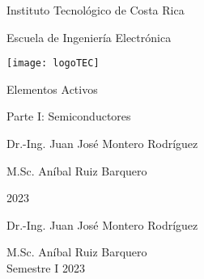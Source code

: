 \begin{titlepage}
\centering\Large
Instituto Tecnológico de Costa Rica

\vspace{5mm}
Escuela de Ingeniería Electrónica

\vspace{10mm}
\texttt{[image: logoTEC]}

\vspace{30mm}
Elementos Activos

\vspace{10mm}
Parte I: Semiconductores

\vspace{30mm}
Dr.-Ing. Juan José Montero Rodríguez

\vspace{5mm}
M.Sc. Aníbal Ruiz Barquero


\vspace{30mm}
2023

\end{titlepage}


\normalsize

\newpage
\thispagestyle{empty}
Dr.-Ing. Juan José Montero Rodríguez

M.Sc. Aníbal Ruiz Barquero \\

Semestre I 2023


\newpage
\tableofcontents
